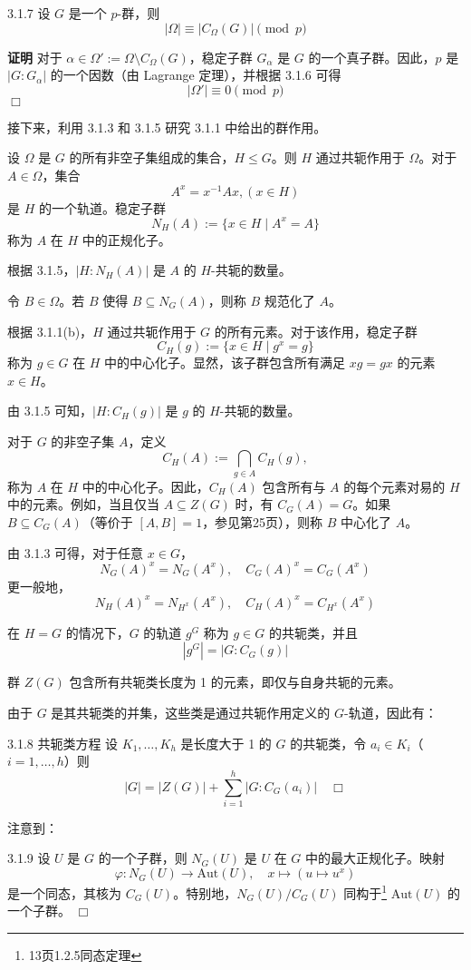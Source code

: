 \documentclass[UTF8]{ctexart}
\begin{document}
3.1.7
设 $G$ 是一个 $p$-群，则
$$
    |\Omega| \equiv |C_\Omega(G)| \pmod{p}
$$

\textbf{证明}
对于 $\alpha \in \Omega' := \Omega \setminus C_\Omega(G)$，稳定子群 $G_\alpha$ 是 $G$ 的一个真子群。因此，$p$ 是 $|G : G_\alpha|$ 的一个因数（由 Lagrange 定理），并根据 3.1.6 可得
$$
    |\Omega'| \equiv 0 \pmod{p}
$$
$\Box$


接下来，利用 3.1.3 和 3.1.5 研究 3.1.1 中给出的群作用。

设 $\Omega$ 是 $G$ 的所有非空子集组成的集合，$H \leq G$。则 $H$ 通过共轭作用于 $\Omega$。对于 $A \in \Omega$，集合
$$
    A^x = x^{-1}Ax  ,(x \in H)
$$
是 $H$ 的一个轨道。稳定子群
$$
    N_H(A) := \{x \in H \mid A^x = A\}
$$
称为 $A$ 在 $H$ 中的正规化子。

根据 3.1.5，$|H : N_H(A)|$ 是 $A$ 的 $H$-共轭的数量。

令 $B \in \Omega$。若 $B$ 使得 $B \subseteq N_G(A)$，则称 $B$ 规范化了 $A$。

根据 3.1.1(b)，$H$ 通过共轭作用于 $G$ 的所有元素。对于该作用，稳定子群
$$
    C_H(g) := \{x \in H \mid g^x = g\}
$$
称为 $g \in G$ 在 $H$ 中的中心化子。显然，该子群包含所有满足 $xg = gx$ 的元素 $x \in H$。

由 3.1.5 可知，$|H : C_H(g)|$ 是 $g$ 的 $H$-共轭的数量。

对于 $G$ 的非空子集 $A$，定义
$$
    C_H(A) := \bigcap_{g \in A} C_H(g),
$$
称为 $A$ 在 $H$ 中的中心化子。因此，$C_H(A)$ 包含所有与 $A$ 的每个元素对易的 $H$ 中的元素。例如，当且仅当 $A \subseteq Z(G)$ 时，有 $C_G(A) = G$。如果 $B \subseteq C_G(A)$（等价于 $[A, B] = 1$，参见第25页），则称 $B$ 中心化了 $A$。

由 3.1.3 可得，对于任意 $x \in G$，
$$
    N_G(A)^x = N_G(A^x), \quad C_G(A)^x = C_G(A^x)
$$
更一般地，
$$
    N_H(A)^x = N_{H^x}(A^x), \quad C_H(A)^x = C_{H^x}(A^x)
$$

在 $H = G$ 的情况下，$G$ 的轨道 $g^G$ 称为 $g \in G$ 的共轭类，并且
$$
    |g^G| = |G : C_G(g)|
$$

群 $Z(G)$ 包含所有共轭类长度为 1 的元素，即仅与自身共轭的元素。

由于 $G$ 是其共轭类的并集，这些类是通过共轭作用定义的 $G$-轨道，因此有：


3.1.8 共轭类方程
设 $K_1, \dots, K_h$ 是长度大于 1 的 $G$ 的共轭类，令 $a_i \in K_i$（$i = 1, \dots, h$）则
$$
    |G| = |Z(G)| + \sum_{i=1}^h |G : C_G(a_i)| \quad \Box
$$


注意到：

3.1.9
设 $U$ 是 $G$ 的一个子群，则 $N_G(U)$ 是 $U$ 在 $G$ 中的最大正规化子。映射
$$
    \varphi : N_G(U) \to \text{Aut}(U), \quad x \mapsto (u \mapsto u^x)
$$
是一个同态，其核为 $C_G(U)$。特别地，$N_G(U)/C_G(U)$ 同构于\footnote[5]{13页1.2.5同态定理} $\text{Aut}(U)$ 的一个子群。 $\Box$
\end{document}
